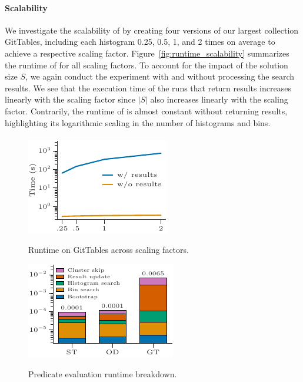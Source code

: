 \paragraph{Scalability}
We investigate the scalability of \system{} by creating four versions of our largest collection GitTables, including each histogram 0.25, 0.5, 1, and 2 times on average to achieve a respective scaling factor.
Figure~\ref{fig:runtime_scalability} summarizes the runtime of \system{} for all scaling factors.
To account for the impact of the solution size $S$, we again conduct the experiment with and without processing the search results.
We see that the execution time of the runs that return results increases linearly with the scaling factor since $|S|$ also increases linearly with the scaling factor.
Contrarily, the runtime of \system{} is almost constant without returning results, highlighting its logarithmic scaling in the number of histograms and bins.

\paragraph{\approximate{}}

\begin{figure}[t]
    \centering
    \begin{minipage}[b]{0.47\linewidth}
        \centering
        \includegraphics{figures/figure_12.pdf}
        \caption{Runtime on Git\-Tables across scaling factors.}
        \label{fig:runtime_scalability}
    \end{minipage}%
    \hfill%
    \begin{minipage}[b]{0.49\linewidth}
        \centering
        \includegraphics{figures/figure_13.pdf}
        \caption{Predicate evaluation runtime breakdown.}
        \label{fig:runtime_breakdown}
    \end{minipage}
\end{figure}

